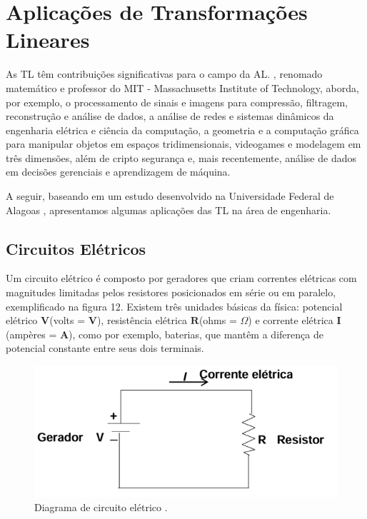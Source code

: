 \chapter{Aplicações de Transformações Lineares}
As TL têm contribuições significativas para o campo da AL. \cite{strang2010}, renomado matemático e professor do MIT - Massachusetts Institute of Technology, aborda, por exemplo, o processamento de sinais e imagens para compressão, filtragem, reconstrução e análise de dados, a análise de redes e sistemas dinâmicos da engenharia elétrica e ciência da computação, a geometria e a computação gráfica para manipular objetos em espaços tridimensionais, videogames e modelagem em três dimensões, além de cripto segurança e, mais recentemente, análise de dados em decisões gerenciais e aprendizagem de máquina. \nocite{pitombeira1971}

A seguir, baseando em um estudo desenvolvido na Universidade Federal de Alagoas \cite{sirlandro2017}, apresentamos algumas aplicações das TL na área de engenharia.

\section{Circuitos Elétricos}
Um circuito elétrico é composto por geradores que criam correntes elétricas com magnitudes limitadas pelos resistores posicionados em série ou em paralelo, exemplificado na figura 12. Existem três unidades básicas da física: potencial elétrico $\mathbf{V}$(volts = $\mathbf{V}$), resistência elétrica $\mathbf{R}$(ohms = $\Omega$) e corrente elétrica $\mathbf{I}$(ampères = $\mathbf{A}$), como por exemplo, baterias, que mantêm a diferença de potencial constante entre seus dois terminais.

\begin{figure}[H]
	\centering
	\includegraphics[scale=0.90]{a_fg1.png}
	\caption{Diagrama de circuito elétrico \cite{sirlandro2017}.}
\end{figure}

